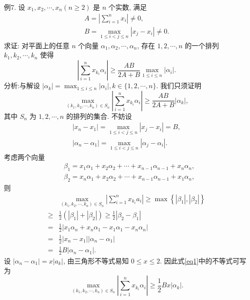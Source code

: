 例7. 设 $x_1, x_2, \cdots, x_n(n \geqslant 2)$ 是 $n$ 个实数, 满足
$$
\begin{gathered}
A=\left|\sum_{i=1}^n x_i\right| \neq 0, \\
B=\max _{1 \leqslant i<j \leqslant n}\left|x_j-x_i\right| \neq 0 .
\end{gathered}
$$
求证: 对平面上的任意 $n$ 个向量 $\alpha_1, \alpha_2, \cdots, \alpha_n$, 存在 $1,2, \cdots, n$ 的一个排列 $k_1, k_2, \cdots, k_n$ 使得
$$
\left|\sum_{i=1}^n x_{k_i} \alpha_i\right| \geqslant \frac{A B}{2 A+B} \max _{1 \leqslant i \leqslant n}\left|\alpha_i\right| .
$$
分析:与解设 $\left|\alpha_k\right|=\max _{1 \leqslant i \leqslant n}\left|\alpha_i\right|, k \in\{1,2, \cdots, n\}$. 我们只须证明
$$
\max _{\left(k_1, k_2, \cdots, k_n\right) \in S_n}\left|\sum_{i=1}^n x_{k_i} \alpha_i\right| \geqslant \frac{A B}{2 A+B}\left|\alpha_k\right|,
$$
其中 $S_n$ 为 $1,2, \cdots, n$ 的排列的集合.
不妨设
$$
\begin{gathered}
\left|x_n-x_1\right|=\max _{1 \leqslant i<j \leqslant n}\left|x_j-x_i\right|=B, \\
\left|\alpha_n-\alpha_1\right|=\max _{1 \leqslant i<j \leqslant n}\left|\alpha_j-\alpha_i\right| .
\end{gathered}
$$
考虑两个向量
$$
\begin{aligned}
& \beta_1=x_1 \alpha_1+x_2 \alpha_2+\cdots+x_{n-1} \alpha_{n-1}+x_n \alpha_n, \\
& \beta_2=x_n \alpha_1+x_2 \alpha_2+\cdots+x_{n-1} \alpha_{n-1}+x_1 \alpha_n,
\end{aligned}
$$
则
$$
\begin{aligned}
& \max _{\left(k_1, k_2, \cdots, k_n\right) \in S_n}\left|\sum_{i=1}^n x_{k_i} a_i\right| \geqslant \max \left\{\left|\beta_1\right|,\left|\beta_2\right|\right\} \\
\geqslant & \frac{1}{2}\left(\left|\beta_1\right|+\left|\beta_2\right|\right) \geqslant \frac{1}{2}\left|\beta_2-\beta_1\right| \\
= & \frac{1}{2}\left|x_1 \alpha_n+x_n \alpha_1-x_1 \alpha_1-x_n \alpha_n\right| \\
= & \frac{1}{2}\left|x_n-x_1\right|\left|\alpha_n-\alpha_1\right| \\
= & \frac{1}{2} B\left|\alpha_n-\alpha_1\right| .
\end{aligned} \label{eq1}
$$
设 $\left|\alpha_n-\alpha_1\right|=x\left|a_k\right|$, 由三角形不等式易知 $0 \leqslant x \leqslant 2$. 因此式\ref{eq1}中的不等式可写为
$$
\max _{\left(k_1, k_2, \cdots, k_n\right) \in S_n}\left|\sum_{i=1}^n x_{k_i} \alpha_i\right| \geqslant \frac{1}{2} B x\left|\alpha_k\right| . \label{eq2}
$$
